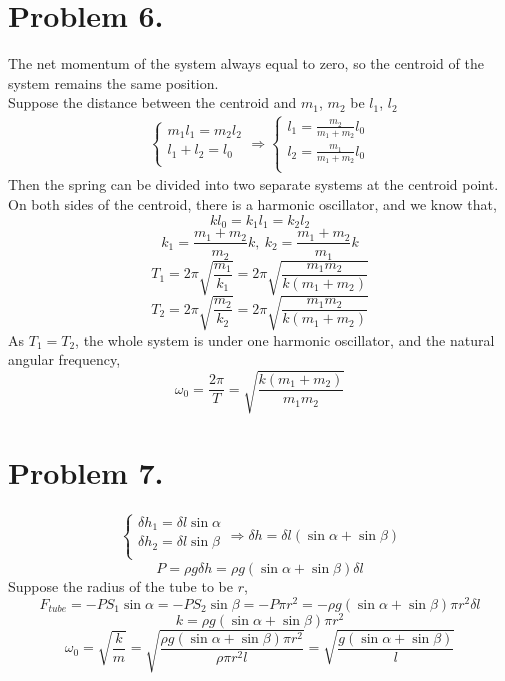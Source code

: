 \documentclass{article}
\begin{document}
\section*{Problem 6.}
	The net momentum of the system always equal to zero, so the centroid of the system remains the same position.\\
	Suppose the distance between the centroid and $m_1$, $m_2$ be $l_1$, $l_2$\\
	\begin{eqnarray*}
		\left\{
		\begin{array}{l}		
			m_1l_1=m_2l_2\\
			l_1+l_2=l_0\\
		\end{array}
		\right.\Longrightarrow
		\left\{
		\begin{array}{l}		
			l_1=\frac{m_2}{m_1+m_2}l_0\\
			l_2=\frac{m_1}{m_1+m_2}l_0\\
		\end{array}
		\right.
	\end{eqnarray*}	 
	Then the spring can be divided into two separate systems at the centroid point.\\
	On both sides of the centroid, there is a harmonic
oscillator, and we know that,\\
	$$kl_0=k_1l_1=k_2l_2$$
	$$k_1=\frac{m_1+m_2}{m_2}k,\ k_2=\frac{m_1+m_2}{m_1}k$$
	$$T_1=2\pi\sqrt{\frac{m_1}{k_1}}=2\pi\sqrt{\frac{m_1m_2}{k(m_1+m_2)}}$$
	$$T_2=2\pi\sqrt{\frac{m_2}{k_2}}=2\pi\sqrt{\frac{m_1m_2}{k(m_1+m_2)}}$$
	As $T_1=T_2$, the whole system is under one harmonic
oscillator, and the natural angular frequency,
	$$\omega_0=\frac{2\pi}{T}=\sqrt{\frac{k(m_1+m_2)}{m_1m_2}}$$
\section*{Problem 7.}
	\begin{eqnarray*}
		\left\{
		\begin{array}{l}		
			\delta h_1=\delta l\sin\alpha\\
			\delta h_2=\delta l\sin\beta\\			
		\end{array}
		\right.\Longrightarrow
		\delta h=\delta l(\sin\alpha+\sin\beta)
	\end{eqnarray*}	 
	$$P=\rho g\delta h=\rho g(\sin\alpha+\sin\beta)\delta l$$
	Suppose the radius of the tube to be $r$,
	$$F_{tube}=-PS_1\sin\alpha=-PS_2\sin\beta=-P\pi r^2=-\rho g(\sin\alpha+\sin\beta)\pi r^2\delta l$$
	$$k=\rho g(\sin\alpha+\sin\beta)\pi r^2$$
	$$\omega_0=\sqrt{\frac{k}{m}}=\sqrt{\frac{\rho g(\sin\alpha+\sin\beta)\pi r^2}{\rho\pi r^2l}}=\sqrt{\frac{g(\sin\alpha+\sin\beta)}{l}}$$
\end{document}
